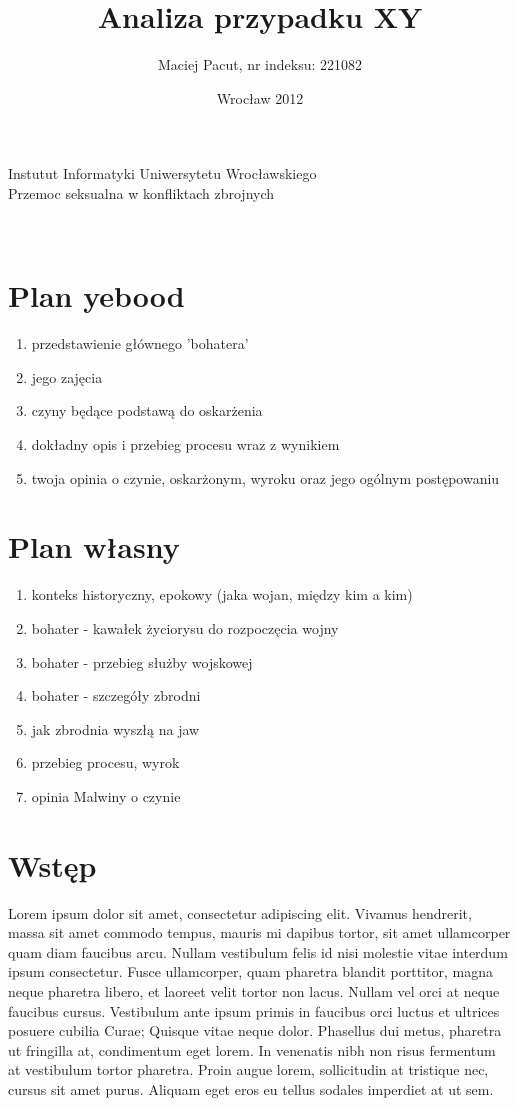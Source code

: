 \documentclass[a4paper,12pt]{article}
\title{Analiza przypadku XY}
\author{Maciej Pacut, nr indeksu: 221082}
\date{Wrocław 2012}
\makeatletter
\renewcommand{\maketitle}{\begin{titlepage}
    \vspace*{1cm}
    \begin{center}
      Instutut Informatyki Uniwersytetu Wrocławskiego\\
      Przemoc seksualna w konfliktach zbrojnych \\
      \vspace{3cm}
      \normalsize \@author \par
      \vspace{0.8cm}
      \noindent
      \LARGE \textsc{\@title}\\
      \vspace{1cm}
      \normalsize
    \end{center}
    \vspace{0.5cm}
    \begin{flushright}
      \vspace{5cm}
    \end{flushright}
    \vspace*{\stretch{6}}
    \begin{center}
      \@date
    \end{center}
  \end{titlepage}%
}
\makeatother
\begin{document}
\maketitle
\newpage

\section{Plan yebood}

\begin{enumerate}
 \item przedstawienie głównego 'bohatera' 
 \item jego zajęcia 
 \item czyny będące podstawą do oskarżenia 
 \item dokładny opis i przebieg procesu wraz z wynikiem 
 \item twoja opinia o czynie, oskarżonym, wyroku oraz jego ogólnym postępowaniu
\end{enumerate}

\section{Plan własny}

\begin{enumerate}
 \item konteks historyczny, epokowy (jaka wojan, między kim a kim)
 \item bohater - kawałek życiorysu do rozpoczęcia wojny
 \item bohater - przebieg służby wojskowej
 \item bohater - szczegóły zbrodni
 \item jak zbrodnia wyszłą na jaw
 \item przebieg procesu, wyrok
 \item opinia Malwiny o czynie
\end{enumerate}

\section{Wstęp}

Lorem ipsum dolor sit amet, consectetur adipiscing elit. Vivamus
hendrerit, massa sit amet commodo tempus, mauris mi dapibus tortor,
sit amet ullamcorper quam diam faucibus arcu. Nullam vestibulum felis
id nisi molestie vitae interdum ipsum consectetur. Fusce ullamcorper,
quam pharetra blandit porttitor, magna neque pharetra libero, et
laoreet velit tortor non lacus. Nullam vel orci at neque faucibus
cursus. Vestibulum ante ipsum primis in faucibus orci luctus et
ultrices posuere cubilia Curae; Quisque vitae neque dolor. Phasellus
dui metus, pharetra ut fringilla at, condimentum eget lorem. In
venenatis nibh non risus fermentum at vestibulum tortor pharetra.
Proin augue lorem, sollicitudin at tristique nec, cursus sit amet
purus. Aliquam eget eros eu tellus sodales imperdiet at ut sem. 
\end{document}
